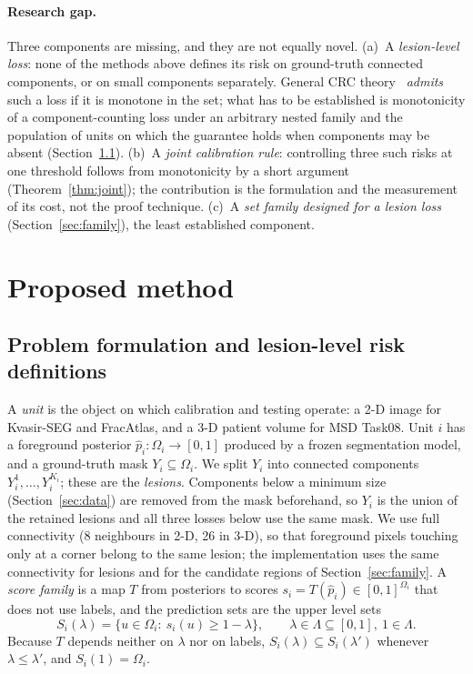 \documentclass[sn-mathphys-num]{sn-jnl}%
\theoremstyle{thmstyleone}
\theoremstyle{thmstyletwo}
\theoremstyle{thmstylethree}
\newcommand{\1}{\mathbb{1}}
\begin{document}
\paragraph{Research gap.}
Three components are missing, and they are not equally novel. (a)~A \emph{lesion-level loss}: none of the methods above defines its risk on ground-truth connected components, or on small components separately. General CRC theory~\cite{angelopoulos2024crc} \emph{admits} such a loss if it is monotone in the set; what has to be established is monotonicity of a component-counting loss under an arbitrary nested family and the population of units on which the guarantee holds when components may be absent (Section~\ref{sec:risks}). (b)~A \emph{joint calibration rule}: controlling three such risks at one threshold follows from monotonicity by a short argument (Theorem~\ref{thm:joint}); the contribution is the formulation and the measurement of its cost, not the proof technique. (c)~A \emph{set family designed for a lesion loss} (Section~\ref{sec:family}), the least established component.

\section{Proposed method}\label{sec:method}

\subsection{Problem formulation and lesion-level risk definitions}\label{sec:risks}

A \emph{unit} is the object on which calibration and testing operate: a 2-D image for Kvasir-SEG and FracAtlas, and a 3-D patient volume for MSD Task08. Unit $i$ has a foreground posterior $\hat p_i:\Omega_i\to[0,1]$ produced by a frozen segmentation model, and a ground-truth mask $Y_i\subseteq\Omega_i$. We split $Y_i$ into connected components $Y_i^1,\dots,Y_i^{K_i}$; these are the \emph{lesions}. Components below a minimum size (Section~\ref{sec:data}) are removed from the mask beforehand, so $Y_i$ is the union of the retained lesions and all three losses below use the same mask. We use full connectivity (8 neighbours in 2-D, 26 in 3-D), so that foreground pixels touching only at a corner belong to the same lesion; the implementation uses the same connectivity for lesions and for the candidate regions of Section~\ref{sec:family}. A \emph{score family} is a map $T$ from posteriors to scores $s_i=T(\hat p_i)\in[0,1]^{\Omega_i}$ that does not use labels, and the prediction sets are the upper level sets
\begin{equation}\label{eq:sets}
S_i(\lambda)=\{u\in\Omega_i:\ s_i(u)\ge 1-\lambda\},\qquad \lambda\in\Lambda\subseteq[0,1],\ 1\in\Lambda .
\end{equation}
Because $T$ depends neither on $\lambda$ nor on labels, $S_i(\lambda)\subseteq S_i(\lambda')$ whenever $\lambda\le\lambda'$, and $S_i(1)=\Omega_i$.
\end{document}
